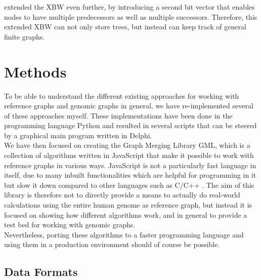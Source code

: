 \documentclass[a4paper,12pt,twoside,BCOR=10mm]{scrbook}
\begin{document}
\citet{Siren2014} extended the XBW even further, by introducing a second bit vector that enables nodes 
to have multiple predecessors as well as multiple successors. Therefore, this extended XBW can not only 
store trees, but instead can keep track of general finite graphs. 

\chapter{Methods}
%

To be able to understand the different existing approaches for working with 
reference graphs and genomic graphs in general, we have re-implemented several 
of these approaches myself. These implementations have been done in the programming 
language Python and resulted in several scripts that can be steered 
by a graphical main program written in Delphi. \\
We have then focused on creating the Graph Merging Library GML, which is a 
collection of algorithms written in JavaScript that make it possible to 
work with reference graphs in various ways. JavaScript is not a particularly fast 
language in itself, due to many inbuilt functionalities which are helpful for programming 
in it but slow it down compared to other languages such as C/C++ \citep{Taivalsaari2008}. 
The aim of this library is therefore not to directly provide a means to actually do 
real-world calculations using the entire human genome as reference graph, 
but instead it is focused on showing how different algorithms work, 
and in general to provide a test bed for working with genomic graphs. \\
Nevertheless, porting these algorithms to a faster programming language 
and using them in a production environment should of course be possible.

\section{Data Formats}
%
\end{document}
